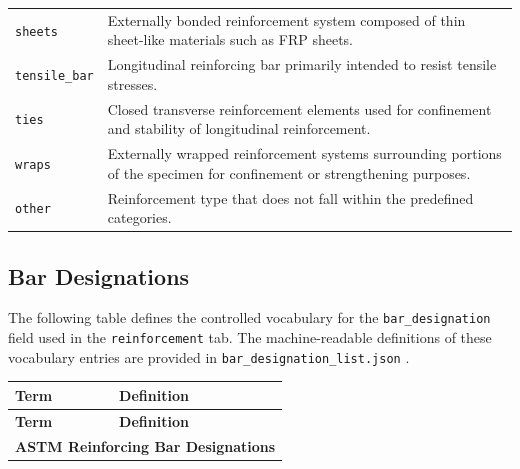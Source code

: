 \documentclass[11pt]{book}
\begin{document}
{\begin{longtable}{p{}p{}}
\texttt{sheets} &
Externally bonded reinforcement system composed of thin sheet-like materials such as FRP sheets. \\

\texttt{tensile\_bar} &
Longitudinal reinforcing bar primarily intended to resist tensile stresses. \\

\texttt{ties} &
Closed transverse reinforcement elements used for confinement and stability of longitudinal reinforcement. \\

\texttt{wraps} &
Externally wrapped reinforcement systems surrounding portions of the specimen for confinement or strengthening purposes. \\

\texttt{other} &
Reinforcement type that does not fall within the predefined categories. \\

\hline
\end{longtable}

\subsection{Bar Designations}
\label{vocab:bar_designation_list}

The following table defines the controlled vocabulary for the \texttt{bar\_designation} field used in the \texttt{reinforcement} tab. The machine-readable definitions of these vocabulary entries are provided in  \texttt{bar\_designation\_list.json} .

\begin{longtable}{p{}p{}}
\hline
\textbf{Term} & \textbf{Definition} \\
\hline
\endfirsthead

\hline
\textbf{Term} & \textbf{Definition} \\
\hline
\endhead

\multicolumn{2}{l}{\textbf{ASTM Reinforcing Bar Designations}}\\
\hline


\end{longtable}}
\end{document}
